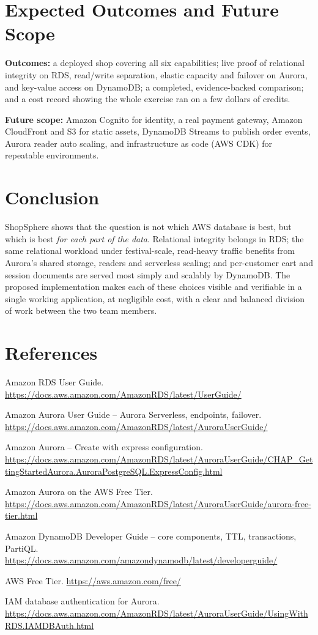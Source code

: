 \documentclass[11pt,a4paper]{article}
\begin{document}
\section{Expected Outcomes and Future Scope}
\textbf{Outcomes:} a deployed shop covering all six capabilities; live proof of relational integrity on RDS, read/write separation, elastic capacity and failover on Aurora, and key-value access on DynamoDB; a completed, evidence-backed comparison; and a cost record showing the whole exercise ran on a few dollars of credits.

\textbf{Future scope:} Amazon Cognito for identity, a real payment gateway, Amazon CloudFront and S3 for static assets, DynamoDB Streams to publish order events, Aurora reader auto scaling, and infrastructure as code (AWS CDK) for repeatable environments.

\section{Conclusion}
ShopSphere shows that the question is not which AWS database is best, but which is best \emph{for each part of the data}. Relational integrity belongs in RDS; the same relational workload under festival-scale, read-heavy traffic benefits from Aurora's shared storage, readers and serverless scaling; and per-customer cart and session documents are served most simply and scalably by DynamoDB. The proposed implementation makes each of these choices visible and verifiable in a single working application, at negligible cost, with a clear and balanced division of work between the two team members.

\section*{References}
\begin{enumerate}[label={[\arabic*]},leftmargin=*]
  \item Amazon RDS User Guide. \url{https://docs.aws.amazon.com/AmazonRDS/latest/UserGuide/}
  \item Amazon Aurora User Guide -- Aurora Serverless, endpoints, failover. \url{https://docs.aws.amazon.com/AmazonRDS/latest/AuroraUserGuide/}
  \item Amazon Aurora -- Create with express configuration. \url{https://docs.aws.amazon.com/AmazonRDS/latest/AuroraUserGuide/CHAP_GettingStartedAurora.AuroraPostgreSQL.ExpressConfig.html}
  \item Amazon Aurora on the AWS Free Tier. \url{https://docs.aws.amazon.com/AmazonRDS/latest/AuroraUserGuide/aurora-free-tier.html}
  \item Amazon DynamoDB Developer Guide -- core components, TTL, transactions, PartiQL. \url{https://docs.aws.amazon.com/amazondynamodb/latest/developerguide/}
  \item AWS Free Tier. \url{https://aws.amazon.com/free/}
  \item IAM database authentication for Aurora. \url{https://docs.aws.amazon.com/AmazonRDS/latest/AuroraUserGuide/UsingWithRDS.IAMDBAuth.html}
\end{enumerate}
\end{document}
